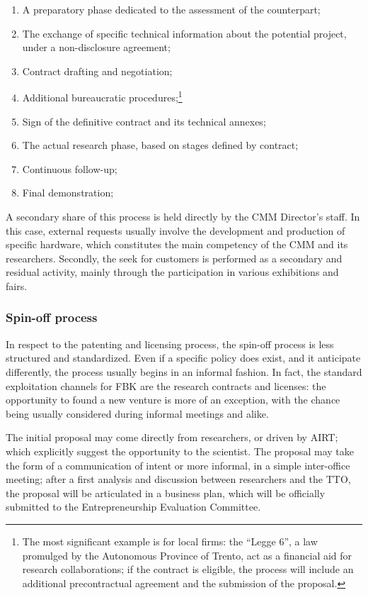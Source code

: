 \begin{enumerate}

\item A preparatory phase dedicated to the assessment of the counterpart;
\item The exchange of specific technical information about the potential project, under a non-disclosure agreement;
\item Contract drafting and negotiation;
\item Additional bureaucratic procedures;\footnote{The most significant example is for local firms: the \enquote{Legge 6}, a law promulged by the Autonomous Province of Trento, act as a financial aid for research collaborations; if the contract is eligible, the process will include an additional precontractual agreement and the submission of the proposal.}
\item Sign of the definitive contract and its technical annexes;
\item The actual research phase, based on stages defined by contract;
\item Continuous follow-up;
\item Final demonstration;

\end{enumerate}

A secondary share of this process is held directly by the CMM Director’s staff. In this case, external requests usually involve the development and production of specific hardware, which constitutes the main competency of the CMM and its researchers. Secondly, the seek for customers is performed as a secondary and residual activity, mainly through the participation in various exhibitions and fairs.

\subsubsection{Spin-off process}

In respect to the patenting and licensing process, the spin-off process is less structured and standardized. Even if a specific policy does exist, and it anticipate differently, the process usually begins in an informal fashion. In fact, the standard exploitation channels for FBK are the research contracts and licenses: the opportunity to found a new venture is more of an exception, with the chance being usually considered during informal meetings and alike.

The initial proposal may come directly from researchers, or driven by AIRT; which explicitly suggest the opportunity to the scientist. The proposal may take the form of a communication of intent or more informal, in a simple inter-office meeting; after a first analysis and discussion between researchers and the TTO, the proposal will be articulated in a business plan, which will be officially submitted to the Entrepreneurship Evaluation Committee. 

